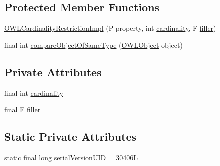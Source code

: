 \subsection*{Protected Member Functions}
\begin{DoxyCompactItemize}
\item 
\hyperlink{classuk_1_1ac_1_1manchester_1_1cs_1_1owl_1_1owlapi_1_1_o_w_l_cardinality_restriction_impl_3_01_r3eca1cd75ac91fcd50a6c201d3538b9b_a0402bb7a730112752c383396f68566aa}{O\-W\-L\-Cardinality\-Restriction\-Impl} (P property, int \hyperlink{classuk_1_1ac_1_1manchester_1_1cs_1_1owl_1_1owlapi_1_1_o_w_l_cardinality_restriction_impl_3_01_r3eca1cd75ac91fcd50a6c201d3538b9b_a9136d7bb56854444ecfadcf5446eedb1}{cardinality}, F \hyperlink{classuk_1_1ac_1_1manchester_1_1cs_1_1owl_1_1owlapi_1_1_o_w_l_cardinality_restriction_impl_3_01_r3eca1cd75ac91fcd50a6c201d3538b9b_ae823a2da6cbfc9ff1754c97b11205219}{filler})
\item 
final int \hyperlink{classuk_1_1ac_1_1manchester_1_1cs_1_1owl_1_1owlapi_1_1_o_w_l_cardinality_restriction_impl_3_01_r3eca1cd75ac91fcd50a6c201d3538b9b_a8f298d20bd0749149eba3b2d7d3b6174}{compare\-Object\-Of\-Same\-Type} (\hyperlink{interfaceorg_1_1semanticweb_1_1owlapi_1_1model_1_1_o_w_l_object}{O\-W\-L\-Object} object)
\end{DoxyCompactItemize}
\subsection*{Private Attributes}
\begin{DoxyCompactItemize}
\item 
final int \hyperlink{classuk_1_1ac_1_1manchester_1_1cs_1_1owl_1_1owlapi_1_1_o_w_l_cardinality_restriction_impl_3_01_r3eca1cd75ac91fcd50a6c201d3538b9b_a9136d7bb56854444ecfadcf5446eedb1}{cardinality}
\item 
final F \hyperlink{classuk_1_1ac_1_1manchester_1_1cs_1_1owl_1_1owlapi_1_1_o_w_l_cardinality_restriction_impl_3_01_r3eca1cd75ac91fcd50a6c201d3538b9b_ae823a2da6cbfc9ff1754c97b11205219}{filler}
\end{DoxyCompactItemize}
\subsection*{Static Private Attributes}
\begin{DoxyCompactItemize}
\item 
static final long \hyperlink{classuk_1_1ac_1_1manchester_1_1cs_1_1owl_1_1owlapi_1_1_o_w_l_cardinality_restriction_impl_3_01_r3eca1cd75ac91fcd50a6c201d3538b9b_a4943d84e1227aeef95f4d90dc1fcac13}{serial\-Version\-U\-I\-D} = 30406\-L
\end{DoxyCompactItemize}


